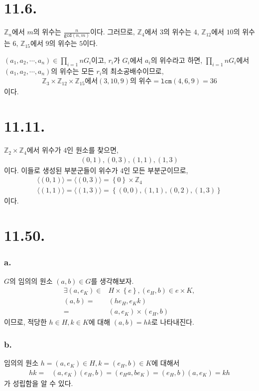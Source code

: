 \documentclass{article}
\begin{document}
\section{11.6.}
$\mathbb{Z}_n$에서 $m$의 위수는 $\frac{n}{\texttt{gcd}(n, m)}$이다. 그러므로, $\mathbb{Z}_4$에서 $3$의 위수는 $4$, $\mathbb{Z}_{12}$에서 $10$의 위수는 $6$, $\mathbb{Z}_{15}$에서 $9$의 위수는 $5$이다.

$(a_1, a_2, \cdots, a_n) \in \prod_{i=1}{n} G_i$이고, $r_i$가 $G_i$에서 $a_i$의 위수라고 하면, $\prod_{i=1}{n} G_i$에서 $(a_1, a_2, \cdots, a_n)$의 위수는 모든 $r_i$의 최소공배수이므로, 
\begin{align*}
\mathbb{Z}_3 \times \mathbb{Z}_{12} \times \mathbb{Z}_{15} \text{에서} (3, 10, 9) \text{의 위수} = \texttt{lcm}(4, 6, 9) = 36
\end{align*}이다.

\section{11.11.}
$\mathbb{Z}_2 \times \mathbb{Z}_4$에서 위수가 $4$인 원소를 찾으면,
\begin{align*}
(0, 1), (0, 3), (1, 1), (1, 3)
\end{align*}이다. 이들로 생성된 부분군들이 위수가 $4$인 모든 부분군이므로,
\begin{align*}
\langle (0, 1) \rangle = \langle (0, 3) \rangle = \left\{0\right\} \times \mathbb{Z}_4
\\ \langle (1, 1) \rangle = \langle (1, 3) \rangle = \left\{ (0, 0), (1, 1), (0, 2), (1, 3) \right\}
\end{align*}이다.

\section{11.50.}
\subsubsection{a.}
$G$의 임의의 원소 $(a, b) \in G$를 생각해보자.
\begin{align*}
\exists (a, e_K) \in& H \times \left\{ e \right\},  (e_H, b) \in {e} \times K,  
\\ (a, b) =& (h e_H, e_K k)
\\ =& (a, e_K) \times (e_H, b) 
\end{align*}이므로, 적당한 $h \in H, k \in K$에 대해 $(a, b) = hk$로 나타내진다.

\subsubsection{b.}
임의의 원소 $h = (a, e_K) \in H, k = (e_H, b) \in K$에 대해서
\begin{align*}
hk =& (a, e_K)(e_H, b) = (e_H a, b e_K) = (e_H, b)(a, e_K) = kh
\end{align*}가 성립함을 알 수 있다.
\end{document}
